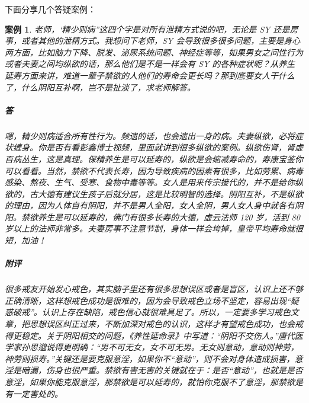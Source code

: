 \documentclass{ctexart}
\newtheorem{case}{案例}
\begin{document}
下面分享几个答疑案例：

\begin{case}
    老师，‘精少则病”这四个字是对所有泄精方式说的吧，无论是 SY 还是房事，或者其他的泄精方式。我想问下老师，SY 会导致很多很多问题，主要是身心两方面，比如脑力下降、脱发、泌尿系统问题、神经症等等，如果男女之间性行为或者夫妻之间均纵欲的话，那么他们是不是一样会有 SY 的各种症状呢？从养生延寿方面来讲，难道一辈子禁欲的人他们的寿命会更长吗？那到底要女人干什么了，什么阴阳互补啊，岂不是扯淡了，求老师解答。
    \subparagraph{答} 嗯，精少则病适合所有性行为。频遗的话，也会遗出一身的病。夫妻纵欲，必将症状缠身。你是否有看彭鑫博士视频，里面就讲到很多纵欲的案例。纵欲伤肾，肾虚百病丛生，这是真理。保精养生是可以延寿的，纵欲是会缩减寿命的，寿康宝鉴你可以看看。当然，禁欲不代表长寿，因为导致疾病的因素有很多，比如劳累、病毒感染、熬夜、生气、受寒、食物中毒等等。女人是用来传宗接代的，并不是给你纵欲的，古大德有建议生孩子后就分居，这是比较明智的选择。阴阳互补，不是纵欲的理由，因为人体自有阴阳，并不是男人全阳，女人全阴，男人女人身中就各有阴阳。禁欲养生是可以延寿的，佛门有很多长寿的大德，虚云法师 120 岁，活到 80 岁以上的法师非常多。夫妻房事不注意节制，身体一样会垮掉，皇帝平均寿命就很短，加油！
    \subparagraph{附评} 很多戒友开始发心戒色，其实脑子里还有很多思想误区或者是盲区，认识上还不够正确清晰，这样想戒色成功是很难的，因为会导致戒色立场不坚定，容易出现“疑惑破戒”。认识上存在缺陷，戒色信心就很难具足了。所以，一定要多学习戒色文章，把思想误区纠正过来，不断加深对戒色的认识，这样才有望戒色成功，也会戒得更稳定。关于阴阳相交的问题，《养性延命录》中写道：“阴阳不交伤人。”唐代医学家孙思邈说得更明确：“男不可无女，女不可无男。无女则意动，意动则神劳，神劳则损寿。”关键还是要克服意淫，如果你不“意动”，则不会对身体造成损害，意淫是暗漏，伤身也很严重。禁欲有害无害的关键就在于：是否“意动”，也就是是否意淫，如果你能克服意淫，那禁欲是可以延寿的，就怕你克服不了意淫，那禁欲是有一定害处的。
\end{case}
\end{document}
